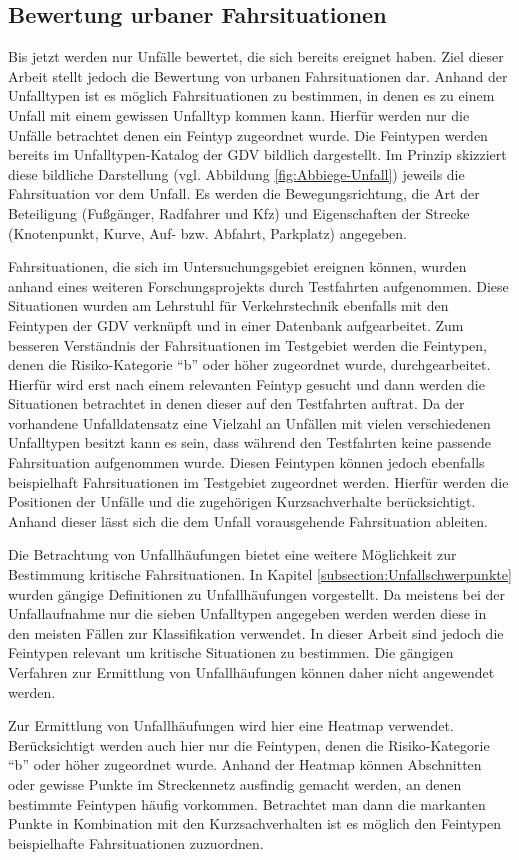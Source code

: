 \subsection{Bewertung urbaner Fahrsituationen}
Bis jetzt werden nur Unfälle bewertet, die sich bereits ereignet haben. Ziel dieser Arbeit stellt jedoch die Bewertung von urbanen Fahrsituationen dar. Anhand der Unfalltypen ist es möglich Fahrsituationen zu bestimmen, in denen es zu einem Unfall mit einem gewissen Unfalltyp kommen kann. Hierfür werden nur die Unfälle betrachtet denen ein Feintyp zugeordnet wurde. Die Feintypen werden bereits im Unfalltypen-Katalog der GDV bildlich dargestellt. Im Prinzip skizziert diese bildliche Darstellung (vgl. Abbildung \ref{fig:Abbiege-Unfall}) jeweils die Fahrsituation vor dem Unfall. Es werden die Bewegungsrichtung, die Art der Beteiligung (Fußgänger, Radfahrer und Kfz) und Eigenschaften der Strecke (Knotenpunkt, Kurve, Auf- bzw. Abfahrt, Parkplatz) angegeben.

Fahrsituationen, die sich im Untersuchungsgebiet ereignen können, wurden anhand eines weiteren Forschungsprojekts durch Testfahrten aufgenommen. Diese Situationen wurden am Lehrstuhl für Verkehrstechnik ebenfalls mit den Feintypen der GDV verknüpft und in einer Datenbank aufgearbeitet. Zum besseren Verständnis der Fahrsituationen im Testgebiet werden die Feintypen, denen die Risiko-Kategorie \enquote{b} oder höher zugeordnet wurde, durchgearbeitet. Hierfür wird erst nach einem relevanten Feintyp gesucht und dann werden die Situationen betrachtet in denen dieser auf den Testfahrten auftrat. Da der vorhandene Unfalldatensatz eine Vielzahl an Unfällen mit vielen verschiedenen Unfalltypen besitzt kann es sein, dass während den Testfahrten keine passende Fahrsituation aufgenommen wurde. Diesen Feintypen können jedoch ebenfalls beispielhaft Fahrsituationen im Testgebiet zugeordnet werden. Hierfür werden die Positionen der Unfälle und die zugehörigen Kurzsachverhalte berücksichtigt. Anhand dieser lässt sich die dem Unfall vorausgehende Fahrsituation ableiten.

Die Betrachtung von Unfallhäufungen bietet eine weitere Möglichkeit zur Bestimmung kritische Fahrsituationen. In Kapitel \ref{subsection:Unfallschwerpunkte} wurden gängige Definitionen zu Unfallhäufungen vorgestellt. Da meistens bei der Unfallaufnahme nur die sieben Unfalltypen angegeben werden werden diese in den meisten Fällen  zur Klassifikation verwendet. In dieser Arbeit sind jedoch die Feintypen relevant um kritische Situationen zu bestimmen. Die gängigen Verfahren zur Ermittlung von Unfallhäufungen können daher nicht angewendet werden.

Zur Ermittlung von Unfallhäufungen wird hier eine Heatmap verwendet. Berücksichtigt werden auch hier nur die Feintypen, denen die Risiko-Kategorie \enquote{b} oder höher zugeordnet wurde. Anhand der Heatmap können Abschnitten oder gewisse Punkte im Streckennetz ausfindig gemacht werden, an denen bestimmte Feintypen häufig vorkommen. Betrachtet man dann die markanten Punkte in Kombination mit den Kurzsachverhalten ist es möglich den Feintypen beispielhafte Fahrsituationen zuzuordnen.
